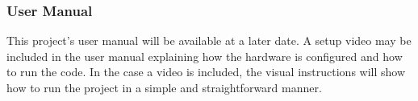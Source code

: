 

\subsubsection{User Manual}
This project's user manual will be available at a later date. A setup video may be included in the user manual explaining how the hardware is configured and how to run the code. In the case a video is included, the visual instructions will show how to run the project in a simple and straightforward manner.
